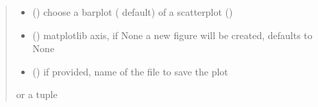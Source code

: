 \documentclass[letterpaper,10pt,english]{sphinxmanual}
\begin{document}
\begin{fulllineitems}
\begin{fulllineitems}
\begin{quote}
\begin{description}
\begin{itemize}
\item {} 
\sphinxAtStartPar
{} () \textendash{} choose a barplot ( default) of a scatterplot ()

\item {} 
\sphinxAtStartPar
{} (\sphinxstyleliteralemphasis{\sphinxupquote{, }}) \textendash{} matplotlib axis, if None a new figure will be created, defaults to None

\item {} 
\sphinxAtStartPar
{} () \textendash{} if provided, name of the file to save the plot

\end{itemize}

\sphinxAtStartPar
{} or a tuple 

\end{description}\end{quote}

\end{fulllineitems}


\end{fulllineitems}

\end{document}
